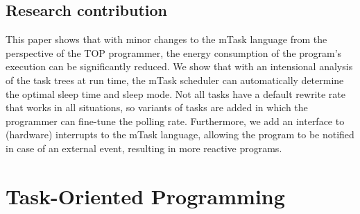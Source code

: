 \documentclass[runningheads]{llncs}
\begin{document}

\subsection{Research contribution}
This paper shows that with minor changes to the mTask language from the perspective of the TOP programmer, the energy consumption of the program's execution can be significantly reduced.
We show that with an intensional analysis of the task trees at run time, the mTask scheduler can automatically determine the optimal sleep time and sleep mode.
Not all tasks have a default rewrite rate that works in all situations, so variants of tasks are added in which the programmer can fine-tune the polling rate.
Furthermore, we add an interface to (hardware) interrupts to the mTask language, allowing the program to be notified in case of an external event, resulting in more reactive programs.


\section{Task-Oriented Programming}%
\label{sec:top}
\end{document}
